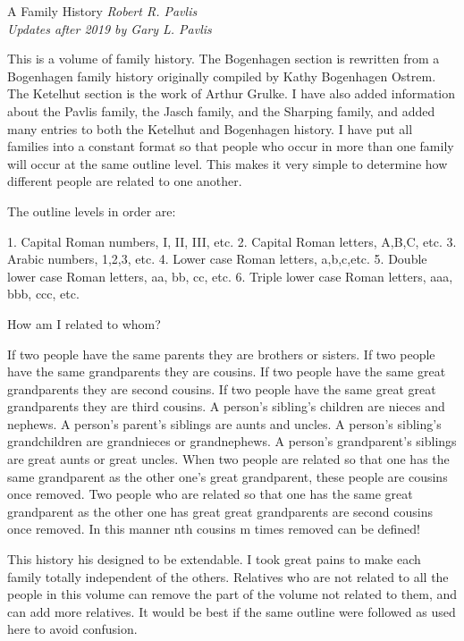 \documentclass[a4paper]{article}
\begin{document}
\hsize=140mm
\begin{center}
{\Huge  A Family History}
\vskip 5mm
{\it Robert R. Pavlis\\
Updates after 2019 by Gary L. Pavlis}
\end{center}
\vskip 6mm
	This is a volume of family history.  The Bogenhagen section is rewritten from a Bogenhagen family history originally compiled by Kathy Bogenhagen Ostrem.  The Ketelhut section is the work of Arthur Grulke.  I have also added information about the Pavlis family, the Jasch family, and the Sharping family, and added many entries to both the Ketelhut and Bogenhagen history.  I have put all families into a constant format so that people who occur in more than one family will occur at the same outline level.  This makes it very simple to determine how different people are related to one another.

\noindent   The outline levels in order are:

	1. Capital Roman numbers, I, II, III, etc.	
	2. Capital Roman letters, A,B,C, etc.
	3. Arabic numbers, 1,2,3, etc.
	4. Lower case Roman letters, a,b,c,etc.
	5. Double lower case Roman letters, aa, bb, cc, etc.
	6. Triple lower case Roman letters, aaa, bbb, ccc, etc.  
  
\noindent How am I related to whom?

	If two people have the same parents they are brothers or sisters.
	If two people have the same grandparents they are cousins.
	If two people have the same great grandparents they are second cousins.
	If two people have the same great great grandparents they are third cousins.  
	A person's sibling's children are nieces and nephews.
	A person's parent's siblings are aunts and uncles.
	A person's sibling's grandchildren are grandnieces or grandnephews.
	A person's grandparent's siblings are great aunts or great uncles.
	When two people are related so that one has the same grandparent as the other one's great grandparent, these people are cousins once removed.  
	Two people who are related so that one has the same great grandparent as the other one has great great grandparents are second cousins once removed.
	In this manner nth cousins m times removed can be defined!

	This history his designed to be extendable.  I took great pains to make each family totally independent of the others.  Relatives who are not related to all the people in this volume can remove the part of the volume not related to them, and can add more relatives.  It would be best if the same outline were followed as used here to avoid confusion.
\end{document}
